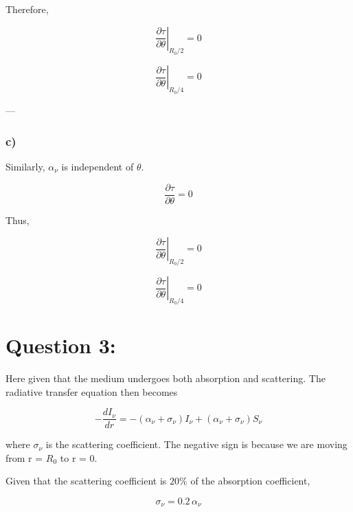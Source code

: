 \documentclass{article}
\begin{document}
Therefore,

\begin{equation}
\boxed{
\left.\frac{\partial\tau}{\partial\theta}\right|_{R_0/2}=0
}
\end{equation}

\begin{equation}
\boxed{
\left.\frac{\partial\tau}{\partial\theta}\right|_{R_0/4}=0
}
\end{equation}

---

\subsubsection{c)}

Similarly, $\alpha_\nu$ is independent of $\theta$.

\begin{equation}
\frac{\partial\tau}{\partial\theta}=0
\end{equation}

Thus,

\begin{equation}
\boxed{
\left.\frac{\partial\tau}{\partial\theta}\right|_{R_0/2}=0
}
\end{equation}

\begin{equation}
\boxed{
\left.\frac{\partial\tau}{\partial\theta}\right|_{R_0/4}=0
}
\end{equation}



\section{Question 3:}

Here given that the medium undergoes both absorption and scattering. The radiative transfer equation then becomes

\begin{equation}
-\frac{dI_\nu}{dr}=-(\alpha_\nu+\sigma_\nu)I_\nu+(\alpha_\nu+\sigma_\nu) S_\nu
\end{equation}

where $\sigma_\nu$ is the scattering coefficient. The negative sign is because we are moving from r = $R_0$ to r = 0.

Given that the scattering coefficient is $20\%$ of the absorption coefficient,

\begin{equation}
\sigma_\nu = 0.2\,\alpha_\nu
\end{equation}
\end{document}
